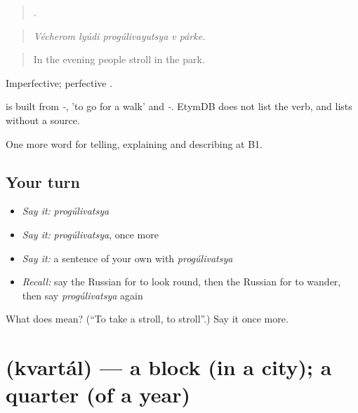 \begin{quote}
    .
\end{quote}

\begin{quote}
\emph{Vécherom lyúdi progúlivayutsya v párke.}
\end{quote}

\begin{quote}
In the evening people stroll in the park.
\end{quote}

Imperfective; perfective \emph{}.

\begin{cousinweb}
\emph{} is built from \emph{-}, \emph{} 'to go for a walk' and \emph{-}. EtymDB does not list the verb, and lists \emph{} without a source.
\end{cousinweb}

\begin{grammarlens}[title={What you've built}]
One more word for telling, explaining and describing at B1.
\end{grammarlens}

\subsection*{Your turn}
\begin{itemize}
\raggedright
  \item \emph{Say it:} \emph{progúlivatsya}
  \item \emph{Say it:} \emph{progúlivatsya}, once more
  \item \emph{Say it:} a sentence of your own with \emph{progúlivatsya}
  \item \emph{Recall:} say the Russian for to look round, then the Russian for to wander, then say \emph{progúlivatsya} again
\end{itemize}

\begin{tcolorbox}[breakable,colback=teal!4,colframe=teal!35!black,title={Before you move on}]
What does  mean? (\textquotedblleft{}To take a stroll, to stroll\textquotedblright{}.) Say it once more.
\end{tcolorbox}
\section[\texorpdfstring{\ru{квартал} (kvartál)}{квартал (kvartál)}]{ (kvartál) — a block (in a city); a quarter (of a year)}

